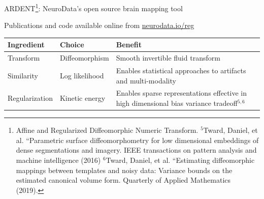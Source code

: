 \documentclass{beamer}
\begin{document}
\begin{frame}{ARDENT\footnote{Affine and Regularized Diffeomorphic Numeric Transform.  $^5$Tward, Daniel, et al. ``Parametric surface diffeomorphometry for low dimensional embeddings of dense segmentations and imagery. IEEE transactions on pattern analysis and machine intelligence (2016) $^6$Tward, Daniel, et al. ``Estimating diffeomorphic mappings between templates and noisy data: Variance bounds on the estimated canonical volume form. Quarterly of Applied Mathematics (2019). }: NeuroData's open source brain mapping tool }

Publications and code available online from \url{neurodata.io/reg}



\vspace{-1.5em}

\begin{table}
\begin{tabular}{p{2.1cm}p{2.3cm}p{5.3cm}}
Ingredient & Choice & Benefit\\
\hline
\hline
Transform & Diffeomorphism & Smooth invertible fluid transform\\
\hline
Similarity & Log likelihood & Enables statistical approaches to artifacts and multi-modality\\
\hline
Regularization & Kinetic energy & Enables sparse representations effective in high dimensional bias variance tradeoff$^{5,6}$
\end{tabular}
\end{table}


\vspace{-1em}


\end{frame}
\end{document}
